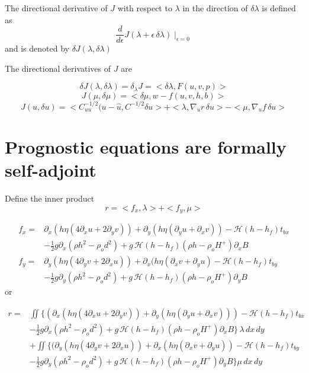 \documentclass[10pt,a4paper]{book}
\newcommand{\He}{\mathcal{H}}
\newcommand{\p}{\partial}
\newcommand{\tbx}{t_{bx}}
\newcommand{\tby}{t_{by}}
\begin{document}
The directional derivative of $J$ with respect to $\lambda$ in the direction of $\delta \lambda$ is defined as
\[ \frac{d}{d \epsilon} J(\lambda+\epsilon \, \delta \lambda)\mid_{\epsilon=0}\] and is denoted by $\delta J(\lambda,\delta \lambda)$


The directional derivatives of $J$ are

\[ \delta J(\lambda,\delta \lambda) = \delta_{\lambda} J =<\delta \lambda,F(u,v,p)> \]
\[ J(\mu,\delta \mu) =<\delta \mu, w-f(u,v,h,b)> \]
\[ J(u,\delta u)=<C^{-1/2}_{uu} (u-\hat{u},C^{-1/2} \delta u > + < \lambda, \nabla_u r \, \delta u>-<\mu , \nabla_u f \, \delta u> \]


\section{Prognostic equations are formally self-adjoint}



Define the inner product
\[
r=< f_x , \lambda> + <f_y , \mu>
\]



\begin{align} 
f_x=&\p_x ( h \eta ( 4 \p_x u + 2 \p_y v)) + \p_y ( h \eta (\p_y u + \p_x v) ) - \He(h-h_f) \tbx  \nonumber \\
&-\frac{1}{2} g \p_x (\rho h^2 - \rho_o d^2)+ g\,\He(h-h_f) (\rho h -\rho_o H^{+}) \p_x B 
\label{eq:A1x}\\
f_y=&\p_y (  h \eta ( 4 \p_y v + 2 \p_x u )) +\p_x ( h \eta (\p_x v + \p_y u ) - \He(h-h_f) \tby  \nonumber \\
&-\frac{1}{2} g \p_y (\rho h^2 - \rho_o d^2)+g\,\He(h-h_f) (\rho h -\rho_o H^{+}) \p_y B
\label{eq:A1y}
\end{align}
or

\begin{align*}
r=& \iint  \big \{ ( \p_x ( h \eta ( 4 \p_x u + 2 \p_y v)) + \p_y ( h \eta (\p_y u + \p_x v) )) - \He(h-h_f) \tbx   \nonumber \\
&-\frac{1}{2} g \p_x (\rho h^2 - \rho_o d^2)+ g\,\He(h-h_f) (\rho h -\rho_o H^{+}) \p_x B \big \} \, \lambda \, dx \, dy \nonumber \\
&+ \iint \big \{ (\p_y (  h \eta ( 4 \p_y v + 2 \p_x u )) +\p_x ( h \eta (\p_x v + \p_y u ) ) - \He(h-h_f) \tby  \nonumber \\
&-\frac{1}{2} g \p_y (\rho h^2 - \rho_o d^2)+g\,\He(h-h_f) (\rho h -\rho_o H^{+}) \p_y B \big \} \mu \, dx \, dy
\end{align*}
\end{document}
